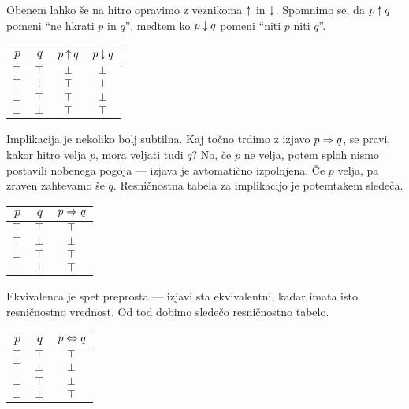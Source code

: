                 Obenem lahko še na hitro opravimo z veznikoma $\mathbin{\uparrow}$ in $\mathbin{\downarrow}$. Spomnimo se, da $p \mathbin{\uparrow} q$ pomeni ``ne hkrati $p$ in $q$'', medtem ko $p \mathbin{\downarrow} q$ pomeni ``niti $p$ niti $q$''.
                \begin{center}
                        \begin{tabular}{cc|cc}
                                $p$ & $q$ & $p \mathbin{\uparrow} q$ & $p \mathbin{\downarrow} q$ \\
                                \hline
                                $\top$ & $\top$ & $\bot$ & $\bot$ \\
                                $\top$ & $\bot$ & $\top$ & $\bot$ \\
                                $\bot$ & $\top$ & $\top$ & $\bot$ \\
                                $\bot$ & $\bot$ & $\top$ & $\top$
                        \end{tabular}
                \end{center}

                Implikacija je nekoliko bolj subtilna. Kaj točno trdimo z izjavo $p \Rightarrow q$, se pravi, kakor hitro velja $p$, mora veljati tudi $q$? No, če $p$ ne velja, potem sploh nismo postavili nobenega pogoja --- izjava je avtomatično izpolnjena. Če $p$ velja, pa zraven zahtevamo še $q$. Resničnostna tabela za implikacijo je potemtakem sledeča.
                \begin{center}
                        \begin{tabular}{cc|c}
                                $p$ & $q$ & $p \Rightarrow q$ \\
                                \hline
                                $\top$ & $\top$ & $\top$ \\
                                $\top$ & $\bot$ & $\bot$ \\
                                $\bot$ & $\top$ & $\top$ \\
                                $\bot$ & $\bot$ & $\top$
                        \end{tabular}
                \end{center}

                Ekvivalenca je spet preprosta --- izjavi sta ekvivalentni, kadar imata isto resničnostno vrednost. Od tod dobimo sledečo resničnostno tabelo.
                \begin{center}
                        \begin{tabular}{cc|c}
                                $p$ & $q$ & $p \Leftrightarrow q$ \\
                                \hline
                                $\top$ & $\top$ & $\top$ \\
                                $\top$ & $\bot$ & $\bot$ \\
                                $\bot$ & $\top$ & $\bot$ \\
                                $\bot$ & $\bot$ & $\top$
                        \end{tabular}
                \end{center}


